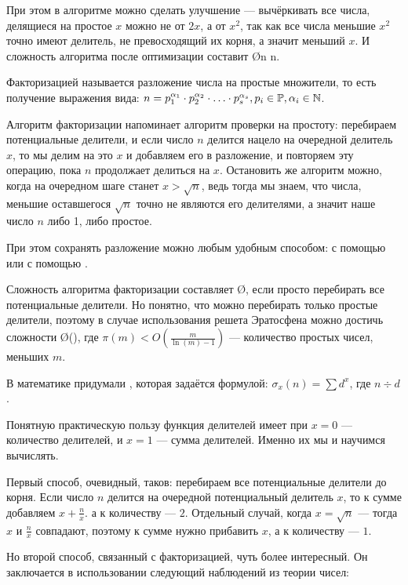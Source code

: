 При этом в алгоритме можно сделать улучшение — вычёркивать все числа, делящиеся на простое $x$ можно не от $2x$, а от $x^2$, так как все числа меньшие $x^2$ точно имеют делитель, не превосходящий их корня, а значит меньший $x$. И сложность алгоритма после оптимизации составит \O{n \log\log n}.


Факторизацией называется разложение числа на простые множители, то есть получение выражения вида: $n = p_1^{\alpha_1} \cdot p_2^{\alpha_2} \cdot \ldots \cdot p_s^{\alpha_s}, p_i \in \mathbb{P}, \alpha_i \in \mathbb{N}$.

Алгоритм факторизации напоминает алгоритм проверки на простоту: перебираем потенциальные делители, и если число $n$ делится нацело на очередной делитель $x$, то мы делим на это $x$ и добавляем его в разложение, и повторяем эту операцию, пока $n$ продолжает делиться на $x$. Остановить же алгоритм можно, когда на очередном шаге станет $x > \sqrt{n}$, ведь тогда мы знаем, что числа, меньшие оставшегося $\sqrt{n}$ точно не являются его делителями, а значит наше число $n$ либо 1, либо простое.

При этом сохранять разложение можно любым удобным способом: с помощью  или с помощью .

Сложность алгоритма факторизации составляет \O{}, если просто перебирать все потенциальные делители. Но понятно, что можно перебирать только простые делители, поэтому в случае использования решета Эратосфена можно достичь сложности \O{\pi()}, где $\pi(m) < O\left(\frac{m}{\ln(m) - 1}\right)$ — количество простых чисел, меньших $m$.


В математике придумали , которая задаётся формулой: $\sigma_x(n) = \sum d^x$, где $n \div d$.

Понятную практическую пользу функция делителей имеет при $x = 0$ — количество делителей, и $x = 1$ — сумма делителей. Именно их мы и научимся вычислять.

Первый способ, очевидный, таков: перебираем все потенциальные делители до корня. Если число $n$ делится на очередной потенциальный делитель $x$, то к сумме добавляем $x + \frac{n}{x}$. а к количеству — $2$. Отдельный случай, когда $x = \sqrt{n}$ — тогда $x$ и $\frac{n}{x}$ совпадают, поэтому к сумме нужно прибавить $x$, а к количеству — $1$.

Но второй способ, связанный с факторизацией, чуть более интересный. Он заключается в использовании следующий наблюдений из теории чисел:

